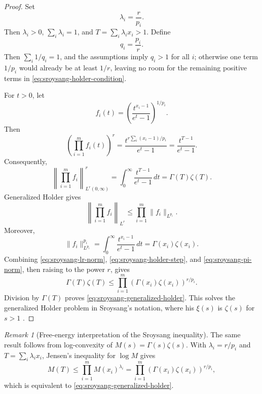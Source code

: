 \documentclass[11pt]{article}
\numberwithin{equation}{section}
\theoremstyle{definition}
\theoremstyle{remark}
\newtheorem{remark}[theorem]{Remark}
\newcommand{\1}{\mathbf 1}
\begin{document}
\begin{proof}
Set
\begin{equation}
\label{eq:sroysang-lambda}
\lambda_i=\frac{r}{p_i}.
\end{equation}
Then \(\lambda_i>0\), \(\sum_i\lambda_i=1\), and \(T=\sum_i\lambda_i x_i>1\).  Define
\begin{equation}
\label{eq:sroysang-q}
q_i=\frac{p_i}{r}.
\end{equation}
Then \(\sum_i1/q_i=1\), and the assumptions imply \(q_i>1\) for all \(i\); otherwise one term \(1/p_i\) would already be at least \(1/r\), leaving no room for the remaining positive terms in \eqref{eq:sroysang-holder-condition}.

For \(t>0\), let
\begin{equation}
\label{eq:sroysang-fi}
f_i(t)=\left(\frac{t^{x_i-1}}{e^t-1}\right)^{1/p_i}.
\end{equation}
Then
\begin{equation}
\label{eq:sroysang-product}
\left(\prod_{i=1}^{m}f_i(t)\right)^r
=\frac{t^{r\sum_i(x_i-1)/p_i}}{e^t-1}
=\frac{t^{T-1}}{e^t-1}.
\end{equation}
Consequently,
\begin{equation}
\label{eq:sroysang-lr-norm}
\left\|\prod_{i=1}^{m}f_i\right\|_{L^r(0,\infty)}^r
=\int_0^\infty\frac{t^{T-1}}{e^t-1}\,dt
=\Gamma(T)\zeta(T).
\end{equation}
Generalized Holder gives
\begin{equation}
\label{eq:sroysang-holder-step}
\left\|\prod_{i=1}^{m}f_i\right\|_{L^r}
\le
\prod_{i=1}^{m}\|f_i\|_{L^{p_i}}.
\end{equation}
Moreover,
\begin{equation}
\label{eq:sroysang-pi-norm}
\|f_i\|_{L^{p_i}}^{p_i}
=\int_0^\infty\frac{t^{x_i-1}}{e^t-1}\,dt
=\Gamma(x_i)\zeta(x_i).
\end{equation}
Combining \eqref{eq:sroysang-lr-norm}, \eqref{eq:sroysang-holder-step}, and \eqref{eq:sroysang-pi-norm}, then raising to the power \(r\), gives
\begin{equation}
\label{eq:sroysang-predivide}
\Gamma(T)\zeta(T)
\le
\prod_{i=1}^{m}(\Gamma(x_i)\zeta(x_i))^{r/p_i}.
\end{equation}
Division by \(\Gamma(T)\) proves \eqref{eq:sroysang-generalized-holder}.  This solves the generalized Holder problem in Sroysang's notation, where his \(\xi(s)\) is \(\zeta(s)\) for \(s>1\) \cite{sroysang}.
\end{proof}

\begin{remark}[Free-energy interpretation of the Sroysang inequality]
The same result follows from log-convexity of \(M(s)=\Gamma(s)\zeta(s)\).  With \(\lambda_i=r/p_i\) and \(T=\sum_i\lambda_ix_i\), Jensen's inequality for \(\log M\) gives
\begin{equation}
\label{eq:sroysang-jensen}
M(T)\le\prod_{i=1}^{m}M(x_i)^{\lambda_i}
=\prod_{i=1}^{m}(\Gamma(x_i)\zeta(x_i))^{r/p_i},
\end{equation}
which is equivalent to \eqref{eq:sroysang-generalized-holder}.
\end{remark}
\end{document}
